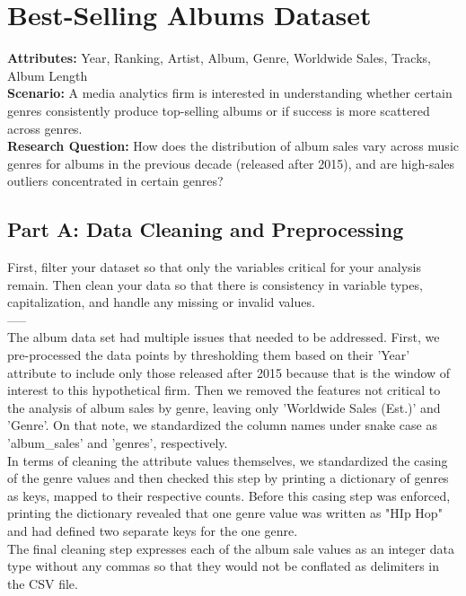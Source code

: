 \section{Best-Selling Albums Dataset}

{\bf Attributes:} Year, Ranking, Artist, Album, Genre, Worldwide Sales, Tracks, Album Length\\

{\bf Scenario:} A media analytics firm is interested in understanding whether certain genres consistently produce top-selling albums or if success is more scattered across genres.\\

{\bf Research Question:} How does the distribution of album sales vary across music genres for albums in the previous decade (released after 2015), and are high-sales outliers concentrated in certain genres?

\subsection{Part A: Data Cleaning and Preprocessing}
First, filter your dataset so that only the variables critical for your analysis remain. Then clean your data so that there is consistency in variable types, capitalization, and handle any missing or invalid values.\\
-----\\
The album data set had multiple issues that needed to be addressed. First, we pre-processed the data points by thresholding them based on their 'Year' attribute to include only those released after 2015 because that is the window of interest to this hypothetical firm. Then we removed the features not critical to the analysis of album sales by genre, leaving only 'Worldwide Sales (Est.)' and 'Genre'. On that note, we standardized the column names under snake case as 'album\_sales' and 'genres', respectively.\\

In terms of cleaning the attribute values themselves, we standardized the casing of the genre values and then checked this step by printing a dictionary of genres as keys, mapped to their respective counts. Before this casing step was enforced, printing the dictionary revealed that one genre value was written as "HIp Hop" and had defined two separate keys for the one genre.\\

The final cleaning step expresses each of the album sale values as an integer data type without any commas so that they would not be conflated as delimiters in the CSV file.\\

